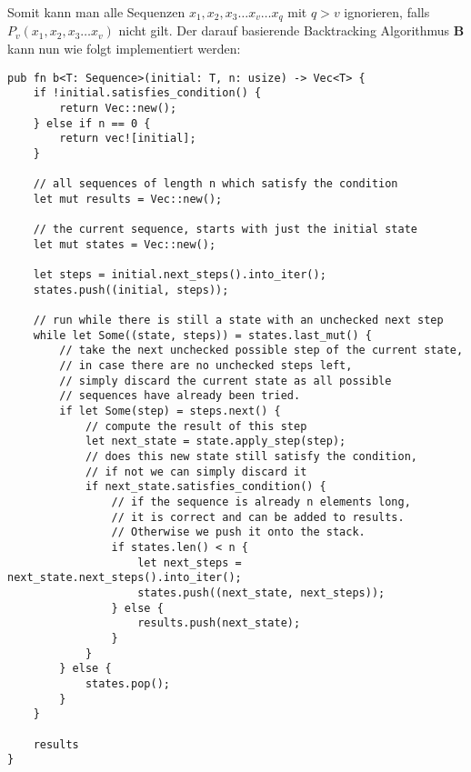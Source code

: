 Somit kann man alle Sequenzen $x_{1}, x_{2}, x_{3} \dots x_{v} \dots x_{q}$ mit $q > v$ ignorieren,
falls $P_{v}(x_{1}, x_{2}, x_{3} \dots x_{v})$ nicht gilt.
Der darauf basierende Backtracking Algorithmus \textbf{B} kann nun wie folgt implementiert werden:
\begin{verbatim}
pub fn b<T: Sequence>(initial: T, n: usize) -> Vec<T> {
    if !initial.satisfies_condition() {
        return Vec::new();
    } else if n == 0 {
        return vec![initial];
    }

    // all sequences of length n which satisfy the condition
    let mut results = Vec::new();

    // the current sequence, starts with just the initial state
    let mut states = Vec::new();

    let steps = initial.next_steps().into_iter();
    states.push((initial, steps));

    // run while there is still a state with an unchecked next step
    while let Some((state, steps)) = states.last_mut() {
        // take the next unchecked possible step of the current state,
        // in case there are no unchecked steps left,
        // simply discard the current state as all possible
        // sequences have already been tried.
        if let Some(step) = steps.next() {
            // compute the result of this step
            let next_state = state.apply_step(step);
            // does this new state still satisfy the condition,
            // if not we can simply discard it
            if next_state.satisfies_condition() {
                // if the sequence is already n elements long,
                // it is correct and can be added to results.
                // Otherwise we push it onto the stack.
                if states.len() < n {
                    let next_steps = next_state.next_steps().into_iter();
                    states.push((next_state, next_steps));
                } else {
                    results.push(next_state);
                }
            }
        } else {
            states.pop();
        }
    }

    results
}
\end{verbatim}


